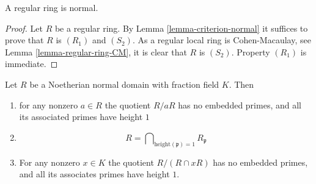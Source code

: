 \begin{lemma}
\label{lemma-regular-normal}
A regular ring is normal.
\end{lemma}

\begin{proof}
Let $R$ be a regular ring. By
Lemma \ref{lemma-criterion-normal}
it suffices to prove that $R$ is $(R_1)$ and $(S_2)$.
As a regular local ring is Cohen-Macaulay, see
Lemma \ref{lemma-regular-ring-CM},
it is clear that $R$ is $(S_2)$.
Property $(R_1)$ is immediate.
\end{proof}

\begin{lemma}
\label{lemma-normal-domain-intersection-localizations-height-1}
Let $R$ be a Noetherian normal domain with fraction field $K$. Then
\begin{enumerate}
\item for any nonzero $a \in R$ the quotient $R/aR$ has no embedded primes,
and all its associated primes have height $1$
\item
$$
R = \bigcap\nolimits_{\text{height}(\mathfrak p) = 1} R_{\mathfrak p}
$$
\item For any nonzero $x \in K$ the quotient $R/(R \cap xR)$
has no embedded primes, and all its associates primes have height $1$.
\end{enumerate}
\end{lemma}

